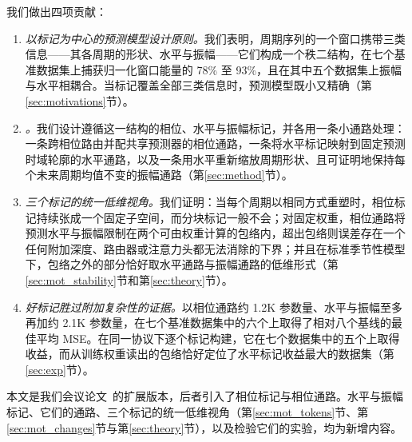 {我们做出四项贡献：
\begin{enumerate}[leftmargin=2em]
\item \emph{以标记为中心的预测模型设计原则。}我们表明，周期序列的一个窗口携带三类信息——其各周期的形状、水平与振幅——它们构成一个秩二结构，在七个基准数据集上捕获归一化窗口能量的 78\% 至 93\%，且在其中五个数据集上振幅与水平相耦合。当标记覆盖全部三类信息时，预测模型既小又精确（第\ref{sec:motivations}节）。

\item \emph{\sysplus。}我们设计遵循这一结构的相位、水平与振幅标记，并各用一条小通路处理：一条跨相位路由并配共享预测器的相位通路，一条将水平标记映射到固定预测时域轮廓的水平通路，以及一条用水平重新缩放周期形状、且可证明地保持每个未来周期均值不变的振幅通路（第\ref{sec:method}节）。

\item \emph{三个标记的统一低维视角。}我们证明：当每个周期以相同方式重塑时，相位标记持续张成一个固定子空间，而分块标记一般不会；对固定权重，相位通路将预测水平与振幅限制在两个可由权重计算的包络内，超出包络则误差存在一个任何附加深度、路由器或注意力头都无法消除的下界；并且在标准季节性模型下，包络之外的部分恰好取水平通路与振幅通路的低维形式（第\ref{sec:mot_stability}节和第\ref{sec:theory}节）。

\item \emph{好标记胜过附加复杂性的证据。}以相位通路约 1.2K 参数量、水平与振幅至多再加约 2.1K 参数量，\sysplus 在七个基准数据集中的六个上取得了相对八个基线的最佳平均 MSE。在同一协议下逐个标记构建，它在七个数据集中的五个上取得收益，而从训练权重读出的包络恰好定位了水平标记收益最大的数据集（第\ref{sec:exp}节）。
\end{enumerate}

本文是我们会议论文~\citep{niu2026phaseformer}的扩展版本，后者引入了相位标记与相位通路。水平与振幅标记、它们的通路、三个标记的统一低维视角（第\ref{sec:mot_tokens}节、第\ref{sec:mot_changes}节与第\ref{sec:theory}节），以及检验它们的实验，均为新增内容。
}
